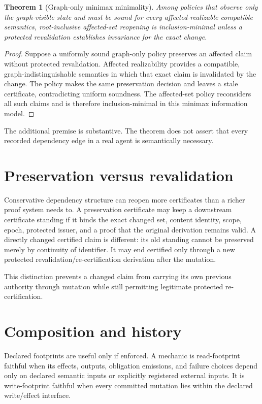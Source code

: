\documentclass[11pt]{article}
\newtheorem{theorem}{Theorem}
\begin{document}
\begin{theorem}[Graph-only minimax minimality]
Among policies that observe only the graph-visible state and must be sound for every affected-realizable compatible semantics, root-inclusive affected-set reopening is inclusion-minimal unless a protected revalidation establishes invariance for the exact change.
\end{theorem}
\begin{proof}
Suppose a uniformly sound graph-only policy preserves an affected claim without protected revalidation. Affected realizability provides a compatible, graph-indistinguishable semantics in which that exact claim is invalidated by the change. The policy makes the same preservation decision and leaves a stale certificate, contradicting uniform soundness. The affected-set policy reconsiders all such claims and is therefore inclusion-minimal in this minimax information model.
\end{proof}

The additional premise is substantive. The theorem does not assert that every recorded dependency edge in a real agent is semantically necessary.

\section{Preservation versus revalidation}
Conservative dependency structure can reopen more certificates than a richer proof system needs to. A preservation certificate may keep a downstream certificate standing if it binds the exact changed set, content identity, scope, epoch, protected issuer, and a proof that the original derivation remains valid. A directly changed certified claim is different: its old standing cannot be preserved merely by continuity of identifier. It may end certified only through a new protected revalidation\slash re-certification derivation after the mutation.

This distinction prevents a changed claim from carrying its own previous authority through mutation while still permitting legitimate protected re-certification.

\section{Composition and history}
Declared footprints are useful only if enforced. A mechanic is read-footprint faithful when its effects, outputs, obligation emissions, and failure choices depend only on declared semantic inputs or explicitly registered external inputs. It is write-footprint faithful when every committed mutation lies within the declared write/effect interface.
\end{document}
